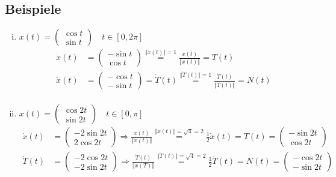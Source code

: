 \documentclass[11pt,a4paper]{book}
\newcommand{\1}    	{\mathbbm{1}}
\begin{document}
\subsection{Beispiele}
\begin{enumerate}[(i)]
	\item \( x(t) = \left( \begin{array}{c}
		\cos t \\
		\sin t
	\end{array} \right) \quad t \in [0,2\pi] \)
	\begin{align*}	 
		\dot{x}(t) &= \left( \begin{array}{c}
			-\sin t \\
			\cos t
		\end{array} \right) 
		\stackrel{\Vert \dot{x}(t) \Vert = 1}{=}
		\frac{\dot{x}(t)}{\Vert \dot{x}(t) \Vert} = T(t)\\
		\ddot{x}(t) &= \left( \begin{array}{c}
			-\cos t \\
			-\sin t
		\end{array} \right) = \dot{T}(t)
		\stackrel{\Vert \dot{T}(t) \Vert = 1}{=} 
		\frac{\dot{T}(t)}{\Vert \dot{T}(t) \Vert} = N(t)\\
	\end{align*}
	\item \( x(t) = \left( \begin{array}{c}
		\cos 2t \\
		\sin 2t
	\end{array} \right) \quad t \in [0,\pi] \)
	\begin{align*}
		\dot{x}(t) &= \left( \begin{array}{c}
			-2\sin 2t \\
			2\cos 2t
		\end{array} \right)
		\Rightarrow \frac{\dot{x}(t)}{\Vert \dot{x}(t) \Vert}
		\stackrel{\Vert \dot{x}(t) \Vert = \sqrt{4} = 2}{=}
		\frac{1}{2} \dot{x}(t) = T(t) = \left( \begin{array}{c}
			-\sin 2t \\
			\cos 2t
		\end{array} \right) \\
		\dot{T}(t) &= \left( \begin{array}{c}
			-2\cos 2t \\
			-2\sin 2t
		\end{array} \right)
		\Rightarrow \frac{\dot{T}(t)}{\Vert \dot{x}(T) \Vert}
		\stackrel{\Vert \dot{T}(t) \Vert = \sqrt{4} = 2}{=}
		\frac{1}{2} \dot{T}(t) = N(t) = \left( \begin{array}{c}
			-\cos 2t \\
			-\sin 2t
		\end{array} \right)
	\end{align*}
\end{enumerate}
\end{document}
